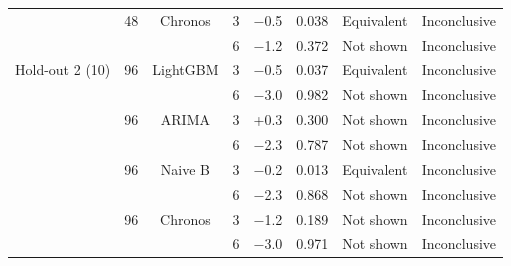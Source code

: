 \begin{tabular}{lcclrrll}
 & 48 & Chronos & 3 & $-$0.5 & 0.038 & Equivalent & Inconclusive \\
 &  &  & 6 & $-$1.2 & 0.372 & Not shown & Inconclusive \\
\midrule
Hold-out 2 (10) & 96 & LightGBM & 3 & $-$0.5 & 0.037 & Equivalent & Inconclusive \\
 &  &  & 6 & $-$3.0 & 0.982 & Not shown & Inconclusive \\
 & 96 & ARIMA & 3 & +0.3 & 0.300 & Not shown & Inconclusive \\
 &  &  & 6 & $-$2.3 & 0.787 & Not shown & Inconclusive \\
 & 96 & Naive B & 3 & $-$0.2 & 0.013 & Equivalent & Inconclusive \\
 &  &  & 6 & $-$2.3 & 0.868 & Not shown & Inconclusive \\
 & 96 & Chronos & 3 & $-$1.2 & 0.189 & Not shown & Inconclusive \\
 &  &  & 6 & $-$3.0 & 0.971 & Not shown & Inconclusive \\
\bottomrule
\end{tabular}
